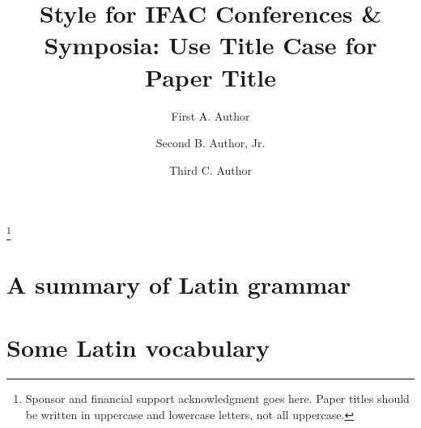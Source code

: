 \documentclass{ifacconf}
\begin{document}
\begin{frontmatter}

\title{Style for IFAC Conferences \& Symposia: Use Title Case for
  Paper Title} 

\thanks[footnoteinfo]{Sponsor and financial support acknowledgment
goes here. Paper titles should be written in uppercase and lowercase
letters, not all uppercase.}

\author[First]{First A. Author} 
\author[Second]{Second B. Author, Jr.} 
\author[Third]{Third C. Author}

\address[First]{National Institute of Standards and Technology, 
   Boulder, CO 80305 USA (e-mail: author@ boulder.nist.gov).}
\address[Second]{Colorado State University, 
   Fort Collins, CO 80523 USA (e-mail: author@lamar. colostate.edu)}
\address[Third]{Electrical Engineering Department, 
   Seoul National University, Seoul, Korea, (e-mail: author@snu.ac.kr)}



\end{frontmatter}








            

\appendix
\section{A summary of Latin grammar}    %
\section{Some Latin vocabulary}              %
\end{document}
